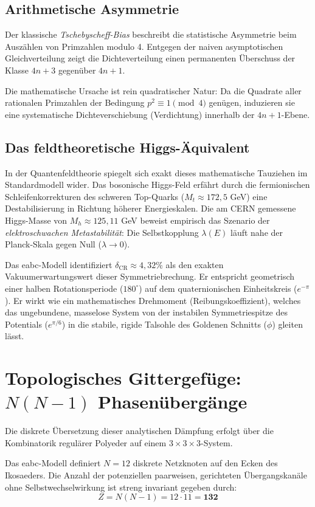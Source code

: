 \documentclass[11pt,a4paper,twocolumn]{article}
\newcommand{\bias}{\delta_{\text{CR}}}
\begin{document}
	\subsection{Arithmetische Asymmetrie}
	Der klassische \textit{Tschebyscheff-Bias} beschreibt die statistische Asymmetrie beim Auszählen von Primzahlen modulo 4. Entgegen der naiven asymptotischen Gleichverteilung zeigt die Dichteverteilung einen permanenten Überschuss der Klasse $4n+3$ gegenüber $4n+1$. 
	
	Die mathematische Ursache ist rein quadratischer Natur: Da die Quadrate aller rationalen Primzahlen der Bedingung $p^2 \equiv 1 \pmod 4$ genügen, induzieren sie eine systematische Dichteverschiebung (Verdichtung) innerhalb der $4n+1$-Ebene.
	
	\subsection{Das feldtheoretische Higgs-Äquivalent}
	In der Quantenfeldtheorie spiegelt sich exakt dieses mathematische Tauziehen im Standardmodell wider. Das bosonische Higgs-Feld erfährt durch die fermionischen Schleifenkorrekturen des schweren Top-Quarks ($M_t \approx 172{,}5$ GeV) eine Destabilisierung in Richtung höherer Energieskalen. Die am CERN gemessene Higgs-Masse von $M_h \approx 125{,}11$ GeV beweist empirisch das Szenario der \textit{elektroschwachen Metastabilität}: Die Selbstkopplung $\lambda(E)$ läuft nahe der Planck-Skala gegen Null ($\lambda \to 0$).
	
	Das eabc-Modell identifiziert $\bias \approx 4{,}32\%$ als den exakten Vakuumerwartungswert dieser Symmetriebrechung. Er entspricht geometrisch einer halben Rotationsperiode ($180^\circ$) auf dem quaternionischen Einheitskreis ($e^{-\pi}$). Er wirkt wie ein mathematisches Drehmoment (Reibungskoeffizient), welches das ungebundene, masselose System von der instabilen Symmetriespitze des Potentials ($e^{\pi/6}$) in die stabile, rigide Talsohle des Goldenen Schnitts ($\phi$) gleiten lässt.
	
	\section{Topologisches Gittergefüge: $N(N-1)$ Phasenübergänge}
	Die diskrete Übersetzung dieser analytischen Dämpfung erfolgt über die Kombinatorik regulärer Polyeder auf einem $3\times3\times3$-System.
	
	Das eabc-Modell definiert $N=12$ diskrete Netzknoten auf den Ecken des Ikosaeders. Die Anzahl der potenziellen paarweisen, gerichteten Übergangskanäle ohne Selbstwechselwirkung ist streng invariant gegeben durch:
	\begin{equation}
		Z = N(N-1) = 12 \cdot 11 = \mathbf{132}
	\end{equation}
	
\end{document}
